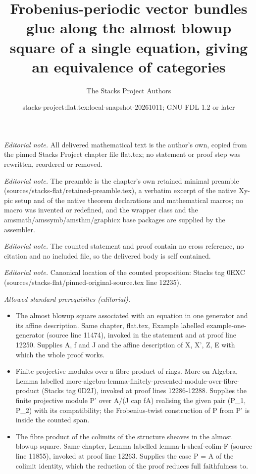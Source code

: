 \documentclass[10pt,a4paper]{amsart}
\title{Frobenius-periodic vector bundles glue along the almost blowup square of a single equation, giving an equivalence of categories}
\author{The Stacks Project Authors}
\date{stacks-project:flat.tex:local-snapshot-20261011; GNU FDL 1.2 or later}
\theoremstyle{plain}
\theoremstyle{definition}
\theoremstyle{remark}
\numberwithin{equation}{subsection}
\begin{document}
\maketitle
\noindent\textit{Editorial note.} All delivered mathematical text is the author's own, copied from the pinned Stacks Project chapter file flat.tex; no statement or proof step was rewritten, reordered or removed.\par\medskip
\noindent\textit{Editorial note.} The preamble is the chapter's own retained minimal preamble (sources/stacks-flat/retained-preamble.tex), a verbatim excerpt of the native Xy-pic setup and of the native theorem declarations and mathematical macros; no macro was invented or redefined, and the wrapper class and the amsmath/amssymb/amsthm/graphicx base packages are supplied by the assembler.\par\medskip
\noindent\textit{Editorial note.} The counted statement and proof contain no cross reference, no citation and no included file, so the delivered body is self contained.\par\medskip
\noindent\textit{Editorial note.} Canonical location of the counted proposition: Stacks tag 0EXC (sources/stacks-flat/pinned-original-source.tex line 12235).\par\medskip
\noindent\textit{Allowed standard prerequisites (editorial).}\begin{itemize}
\item The almost blowup square associated with an equation in one generator and its affine description. Same chapter, flat.tex, Example labelled example-one-generator (source line 11474), invoked in the statement and at proof line 12250. Supplies A, f and J and the affine description of X, X', Z, E with which the whole proof works.
\item Finite projective modules over a fibre product of rings. More on Algebra, Lemma labelled more-algebra-lemma-finitely-presented-module-over-fibre-product (Stacks tag 0D2J), invoked at proof lines 12286-12288. Supplies the finite projective module P' over A/(J cap fA) realising the given pair (P\_1, P\_2) with its compatibility; the Frobenius-twist construction of P from P' is inside the counted span.
\item The fibre product of the colimits of the structure sheaves in the almost blowup square. Same chapter, Lemma labelled lemma-h-sheaf-colim-F (source line 11855), invoked at proof line 12263. Supplies the case P = A of the colimit identity, which the reduction of the proof reduces full faithfulness to.
\end{itemize}\medskip
\end{document}
